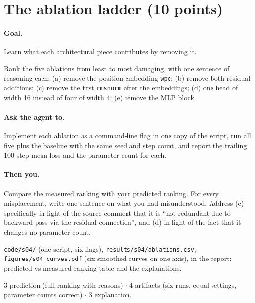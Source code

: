 \documentclass[11pt,letterpaper]{article}
\newcommand{\agent}[1]{\paragraph{Ask the agent to.} #1}
\newcommand{\you}[1]{\paragraph{Then you.} #1}
\newcommand{\goal}[1]{\paragraph{Goal.} #1}
\begin{document}
\section{The ablation ladder \hfill (10 points)}
\goal{Learn what each architectural piece contributes by removing it.}
\begin{predict}
Rank the five ablations from least to most damaging, with one sentence of reasoning each: (a) remove the position embedding \texttt{wpe}; (b) remove both residual additions; (c) remove the first \texttt{rmsnorm} after the embeddings; (d) one head of width 16 instead of four of width 4; (e) remove the MLP block.
\end{predict}
\agent{Implement each ablation as a command-line flag in one copy of the script, run all five plus the baseline with the same seed and step count, and report the trailing 100-step mean loss and the parameter count for each.}
\you{Compare the measured ranking with your predicted ranking. For every misplacement, write one sentence on what you had misunderstood. Address (c) specifically in light of the source comment that it is ``not redundant due to backward pass via the residual connection'', and (d) in light of the fact that it changes no parameter count.}
\begin{deliver}
\texttt{code/s04/} (one script, six flags), \texttt{results/s04/ablations.csv}, \texttt{figures/s04\_curves.pdf} (six smoothed curves on one axis), in the report: predicted vs measured ranking table and the explanations.
\end{deliver}
\begin{rubric}3 prediction (full ranking with reasons) $\cdot$ 4 artifacts (six runs, equal settings, parameter counts correct) $\cdot$ 3 explanation.\end{rubric}

\end{document}

